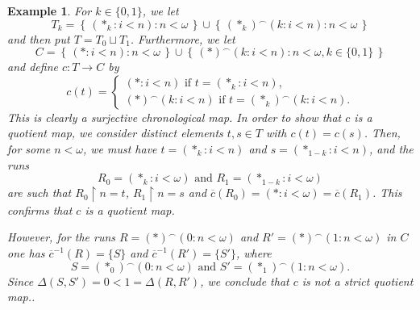 \documentclass[12pt]{amsart}
\newtheorem{ex}[thm]{Example}
\theoremstyle{definition}
\newcommand{\set}[1]{\left\{\, {#1} \,\right\}}
\newcommand{\seq}[1]{{\left( {#1} \right)}}
\DeclareMathOperator{\restrict}{\upharpoonright}
\begin{document}
\begin{ex}\label{EX_RegEpic_not_Porj}
	For  $k\in \{0,1\}$, we let
	\[
	T_k = \set{\seq{\ast_k: i<n}:n<\omega}\cup\set{\seq{\ast_k}^\smallfrown\seq{k:i<n}:n<\omega}
	\]
	and then put $T = T_0\sqcup T_1$. Furthermore, we let
	\[
	C = \set{\seq{\ast: i<n}:n<\omega}\cup\set{\seq{\ast}^\smallfrown\seq{k:i<n}:n<\omega, k\in \{0,1\}}
	\]
	and define $c\colon T\to C$ by
	\[
	c(t) = \begin{cases}
		\seq{\ast:i<n} \text{ if $t = \seq{\ast_k:i<n}$},\\
		\seq{\ast}^\smallfrown\seq{k:i<n} \text{ if $t = \seq{\ast_k}^\smallfrown\seq{k:i<n}$}.
	\end{cases}
	\]
	This is clearly a surjective chronological map. In order to show that $c$ is a quotient map, we consider distinct  elements $t,s\in T$ with $c(t)=c(s)$. Then, for some $n<\omega$, we must have  $t = \seq{\ast_k:i<n}$ and $s = \seq{\ast_{1-k}:i<n}$, and the runs
	\[
	R_0 = \seq{\ast_k:i<\omega} \text{ and }
	R_1 = \seq{\ast_{1-k}:i<\omega}
	\]
	are such that $R_0\restrict n = t$, $R_1\restrict n = s$ and $\overline{c}(R_0)=\seq{\ast:i<\omega}=\overline{c}(R_1)$. This confirms that $c$ is a quotient map.
	
	However, for the runs $R = \seq{\ast}^\smallfrown \seq{0:n<\omega}$  and $R' =  \seq{\ast}^\smallfrown \seq{1:n<\omega}$ in $C$ one has $\overline{c}^{-1}(R) = \{S\}$ and $\overline{c}^{-1}(R') = \{S'\}$, where 
	\[
	S = \seq{\ast_0}^\smallfrown \seq{0:n<\omega} \text{ and }
	S' = \seq{\ast_1}^\smallfrown \seq{1:n<\omega}.
	\]
	Since $\Delta(S,S') = 0 < 1 = \Delta(R,R')$, we conclude that $c$ is not a strict quotient map..
\end{ex}
\end{document}
